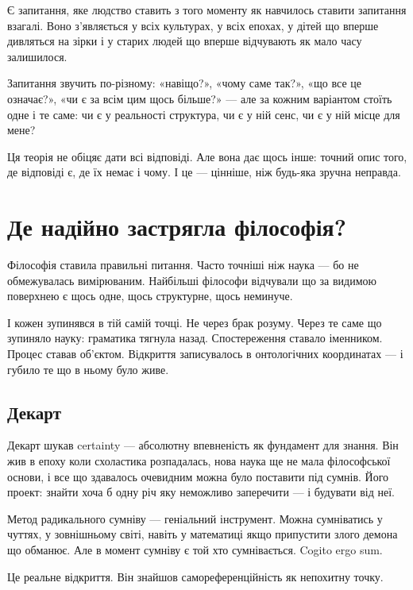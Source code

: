 \documentclass[12pt, a4paper, openany]{book}
\begin{document}
Є запитання, яке людство ставить з того моменту як навчилось ставити запитання взагалі.
Воно з'являється у всіх культурах, у всіх епохах, у дітей що вперше дивляться на зірки
і у старих людей що вперше відчувають як мало часу залишилося.

Запитання звучить по-різному: «навіщо?», «чому саме так?», «що все це означає?»,
«чи є за всім цим щось більше?» — але за кожним варіантом стоїть одне і те саме:
чи є у реальності структура, чи є у ній сенс, чи є у ній місце для мене?

Ця теорія не обіцяє дати всі відповіді. Але вона дає щось інше: точний опис
того, де відповіді є, де їх немає і чому. І це — цінніше, ніж будь-яка зручна неправда.




\chapter{Де надійно застрягла філософія?}

Філософія ставила правильні питання. Часто точніші ніж наука --- бо не обмежувалась вимірюваним. Найбільші філософи відчували що за видимою поверхнею є щось одне, щось структурне, щось неминуче.

І кожен зупинявся в тій самій точці. Не через брак розуму. Через те саме що зупиняло науку: граматика тягнула назад. Спостереження ставало іменником. Процес ставав об'єктом. Відкриття записувалось в онтологічних координатах --- і губило те що в ньому було живе.

\section{Декарт}

Декарт шукав certainty --- абсолютну впевненість як фундамент для знання. Він жив в епоху коли схоластика розпадалась, нова наука ще не мала філософської основи, і все що здавалось очевидним можна було поставити під сумнів. Його проект: знайти хоча б одну річ яку неможливо заперечити --- і будувати від неї.

Метод радикального сумніву --- геніальний інструмент. Можна сумніватись у чуттях, у зовнішньому світі, навіть у математиці якщо припустити злого демона що обманює. Але в момент сумніву є той хто сумнівається. Cogito ergo sum.

Це реальне відкриття. Він знайшов самореференційність як непохитну точку.
\end{document}
